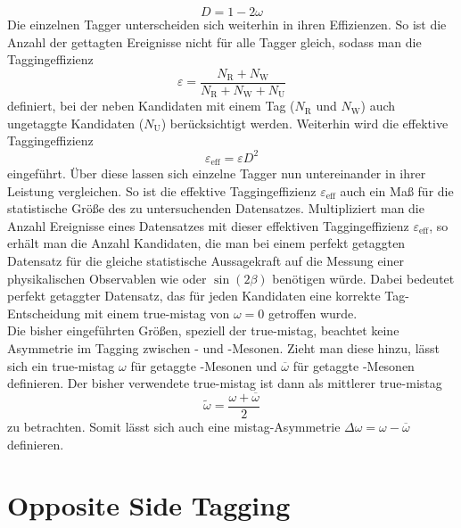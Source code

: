 \begin{equation}
D=1-2\omega
\end{equation}
Die einzelnen Tagger unterscheiden sich weiterhin in ihren Effizienzen. So ist die Anzahl der gettagten Ereignisse nicht für alle Tagger gleich, sodass  man die Taggingeffizienz
\begin{equation}
\varepsilon=\frac{N_{\text{R}}+N_{\text{W}}}{N_{\text{R}}+N_{\text{W}}+N_{\text{U}}}
\end{equation}
definiert, bei der neben Kandidaten mit einem Tag ($N_\text{R}$ und $N_\text{W}$) auch ungetaggte Kandidaten ($N_\text{U}$) berücksichtigt werden. Weiterhin wird die effektive Taggingeffizienz
\begin{equation}
\varepsilon_\text{eff}=\varepsilon D^2
\end{equation}
eingeführt. Über diese lassen sich einzelne Tagger nun untereinander in ihrer Leistung vergleichen. So ist die effektive Taggingeffizienz $\varepsilon_\text{eff}$ auch ein Maß für die statistische Größe des zu untersuchenden Datensatzes. Multipliziert man die Anzahl Ereignisse eines Datensatzes mit dieser effektiven Taggingeffizienz $\varepsilon_\text{eff}$, so erhält man die Anzahl Kandidaten, die man bei einem perfekt getaggten Datensatz für die gleiche statistische Aussagekraft auf die Messung einer physikalischen Observablen wie \dmd oder $\sin\left(2\beta\right)$ benötigen würde. Dabei bedeutet perfekt getaggter Datensatz, das für jeden Kandidaten eine korrekte Tag-Entscheidung mit einem true-mistag von $\omega=0$ getroffen wurde.\\
Die bisher eingeführten Größen, speziell der true-mistag, beachtet keine Asymmetrie im Tagging zwischen \Bz- und \Bzb-Mesonen. Zieht man diese hinzu, lässt sich ein true-mistag $\omega$ für getaggte \Bz-Mesonen und $\overline{\omega}$ für getaggte \Bzb-Mesonen definieren. Der bisher verwendete true-mistag ist dann als mittlerer true-mistag 
\begin{equation}
\widetilde{\omega}=\frac{\omega+\overline{\omega}}{2}
\end{equation}
zu betrachten. Somit lässt sich auch eine mistag-Asymmetrie $\Delta\omega=\omega-\overline{\omega}$ definieren.

\section{Opposite Side Tagging}\label{sec:ostagging}

